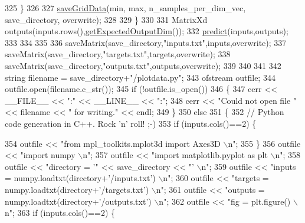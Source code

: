 \begin{DoxyCode}
325     \}
326     
327     \hyperlink{classDmpBbo_1_1FunctionApproximator_a53d95f63de3b49491b1204f45a24ae25}{saveGridData}(min, max, n\_samples\_per\_dim\_vec, save\_directory, overwrite);
328     
329   \}
330 
331   MatrixXd outputs(inputs.rows(),\hyperlink{classDmpBbo_1_1FunctionApproximator_a6ad3f18b3d0ebb913a6a914be60b77e1}{getExpectedOutputDim}());
332   \hyperlink{classDmpBbo_1_1FunctionApproximator_a0547681a81d4c43ce2601f16047baf7a}{predict}(inputs,outputs);
333 
334     
335 
336   saveMatrix(save\_directory,\textcolor{stringliteral}{"inputs.txt"},inputs,overwrite);
337   saveMatrix(save\_directory,\textcolor{stringliteral}{"targets.txt"},targets,overwrite);
338   saveMatrix(save\_directory,\textcolor{stringliteral}{"outputs.txt"},outputs,overwrite);
339   
340   
341   
342   \textcolor{keywordtype}{string} filename = save\_directory+\textcolor{stringliteral}{"/plotdata.py"};
343   ofstream outfile;
344   outfile.open(filename.c\_str()); 
345   \textcolor{keywordflow}{if} (!outfile.is\_open())
346   \{
347     cerr << \_\_FILE\_\_ << \textcolor{stringliteral}{":"} << \_\_LINE\_\_ << \textcolor{stringliteral}{":"};
348     cerr << \textcolor{stringliteral}{"Could not open file "} << filename << \textcolor{stringliteral}{" for writing."} << endl;
349   \} 
350   \textcolor{keywordflow}{else}
351   \{
352     \textcolor{comment}{// Python code generation in C++. Rock 'n' roll! ;-)}
353     \textcolor{keywordflow}{if} (inputs.cols()==2) \{                                                                                
                 
354       outfile << \textcolor{stringliteral}{"from mpl\_toolkits.mplot3d import Axes3D                                       \(\backslash\)n"};
355     \}
356     outfile   << \textcolor{stringliteral}{"import numpy                                                                  \(\backslash\)n"};
357     outfile   << \textcolor{stringliteral}{"import matplotlib.pyplot as plt                                               \(\backslash\)n"};
358     outfile   << \textcolor{stringliteral}{"directory = '"} << save\_directory << \textcolor{stringliteral}{"'                                        \(\backslash\)n"};
359     outfile   << \textcolor{stringliteral}{"inputs   = numpy.loadtxt(directory+'/inputs.txt')                             \(\backslash\)n"};
360     outfile   << \textcolor{stringliteral}{"targets  = numpy.loadtxt(directory+'/targets.txt')                            \(\backslash\)n"};
361     outfile   << \textcolor{stringliteral}{"outputs  = numpy.loadtxt(directory+'/outputs.txt')                            \(\backslash\)n"};
362     outfile   << \textcolor{stringliteral}{"fig = plt.figure()                                                            \(\backslash\)n"};
363     \textcolor{keywordflow}{if} (inputs.cols()==2) \{                                                                                
                 

\end{DoxyCode}
